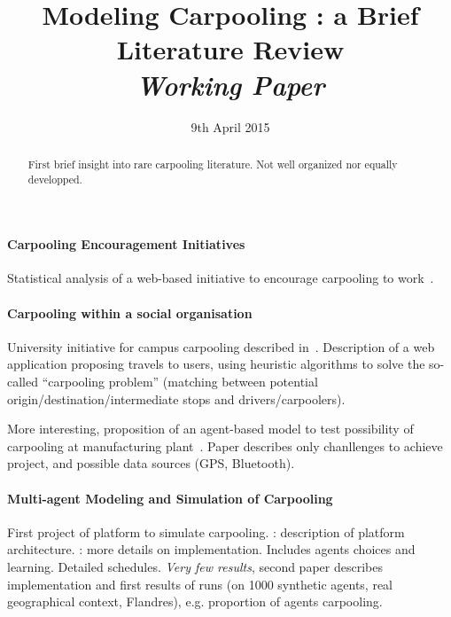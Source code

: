 


\title{Modeling Carpooling : a Brief Literature Review\bigskip\\
\textit{Working Paper}
}

\author{}
\date{9th April 2015}


\maketitle

\justify


\begin{abstract}
\centering
First brief insight into rare carpooling literature. Not well organized nor equally developped.
\end{abstract}



\paragraph{Carpooling Encouragement Initiatives}

Statistical analysis of a web-based initiative to encourage carpooling to work~\cite{Abrahamse201245}.

\paragraph{Carpooling within a social organisation}

University initiative for campus carpooling described in~\cite{Bruglieri2011558}. Description of a web application proposing travels to users, using heuristic algorithms to solve the so-called ``carpooling problem'' (matching between potential origin/destination/intermediate stops and drivers/carpoolers).

More interesting, proposition of an agent-based model to test possibility of carpooling at manufacturing plant~\cite{Bellemans20121221}. Paper describes only chanllenges to achieve project, and possible data sources (GPS, Bluetooth).



\paragraph{Multi-agent Modeling and Simulation of Carpooling}

First project of platform to simulate carpooling. \cite{Galland2013860} : description of platform architecture. \cite{galland2014multi} : more details on implementation. Includes agents choices and learning. Detailed schedules. \textit{Very few results}, second paper describes implementation and first results of runs (on 1000 synthetic agents, real geographical context, Flandres), e.g. proportion of agents carpooling.

